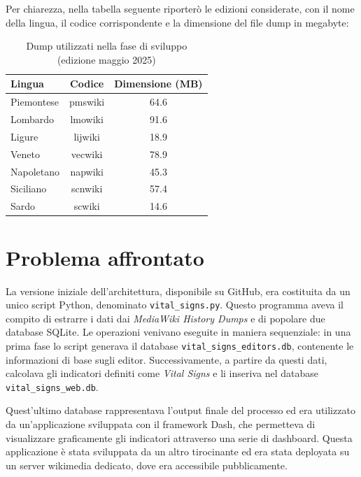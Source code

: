 Per chiarezza, nella tabella seguente riporterò le edizioni considerate, con il nome della lingua, il codice corrispondente e la dimensione del file dump in megabyte:
\begin{table}[h]
    \centering
    \begin{tabular}{|l|c|c|}
        \hline
        \textbf{Lingua} & \textbf{Codice} & \textbf{Dimensione (MB)} \\
        \hline
        Piemontese & pmswiki & 64.6 \\
        Lombardo   & lmowiki & 91.6 \\
        Ligure     & lijwiki & 18.9 \\
        Veneto     & vecwiki & 78.9 \\
        Napoletano & napwiki & 45.3 \\
        Siciliano  & scnwiki & 57.4 \\
        Sardo      & scwiki  & 14.6 \\
        \hline
    \end{tabular}
    \caption{Dump utilizzati nella fase di sviluppo (edizione maggio 2025)}
    \label{tab:dumps_sviluppo}
\end{table}


\section{Problema affrontato}
\label{sec:problema_affrontato}

La versione iniziale dell’architettura, disponibile su GitHub, era costituita da un unico script Python, denominato \texttt{vital\_signs.py}. Questo programma aveva il compito di estrarre i dati dai \textit{MediaWiki History Dumps} e di popolare due database SQLite. Le operazioni venivano eseguite in maniera sequenziale: in una prima fase lo script generava il database \texttt{vital\_signs\_editors.db}, contenente le informazioni di base sugli editor. Successivamente, a partire da questi dati, calcolava gli indicatori definiti come \textit{Vital Signs} e li inseriva nel database \texttt{vital\_signs\_web.db}.


Quest’ultimo database rappresentava l’output finale del processo ed era utilizzato da un’applicazione sviluppata con il framework Dash, che permetteva di visualizzare graficamente gli indicatori attraverso una serie di dashboard.
Questa applicazione è stata sviluppata da un altro tirocinante ed era stata deployata su un server wikimedia dedicato, dove era accessibile pubblicamente.

